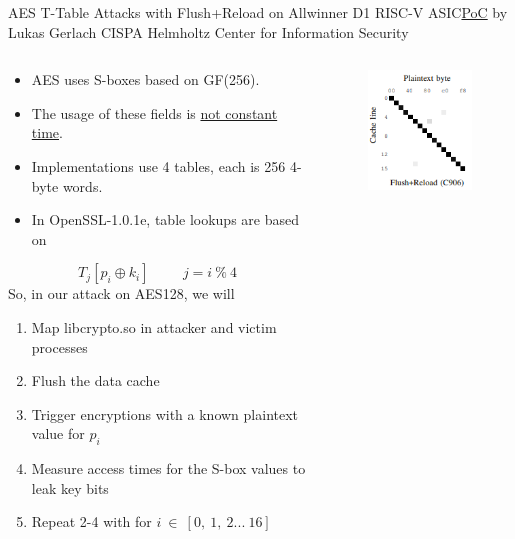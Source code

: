\begin{frame}{AES T-Table Attacks with Flush+Reload on Allwinner D1 RISC-V ASIC}{\href{https://github.com/cispa/Security-RISC/blob/main/aes_example/fr/spy.cpp}{PoC} by Lukas Gerlach CISPA Helmholtz Center for Information Security }
    \begin{columns}
        \begin{column}{0.67\textwidth}
            \begin{itemize}
                \item AES uses S-boxes based on GF(256).
                \item The usage of these fields is \href{https://cr.yp.to/antiforgery/cachetiming-20041111.pdf}{\color{pink} not constant time}. 
                \item Implementations use 4 tables, each is 256 4-byte words.
                \item In OpenSSL-1.0.1e, table lookups are based on 
            \end{itemize}
            \begin{equation*}
                        T_j\left[p_i \oplus k_i\right] \hspace{1cm} j = i\ \%\ 4
            \end{equation*}
            So, in our attack on AES128, we will
            \begin{enumerate}
                \item Map libcrypto.so in attacker and victim processes
                \item Flush the data cache
                \item Trigger encryptions with a known plaintext value for $p_i$
                \item Measure access times for the S-box values to leak key bits
                \item Repeat 2-4 with for $i\ \in\ \left[0,\ 1,\ 2...\ 16\right] $
            \end{enumerate}
        \end{column}
        \begin{column}{0.33\textwidth}      
            \begin{figure}
                \centering
                \includegraphics{images/flush_reload.png}

\end{figure}
\end{column}
\end{columns}
\end{frame}
